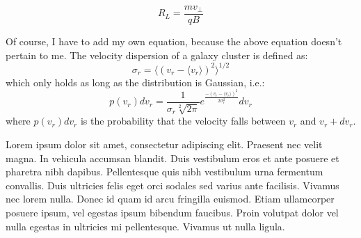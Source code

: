 \begin{equation}
\label{eqn:fakeequation}
R_{L} = \frac{mv_{\perp}}{qB}
\end{equation}

Of course, I have to add my own equation, because the above equation doesn't pertain to me.  The velocity dispersion of a galaxy cluster is defined as:
\begin{equation}
\label{eqn:velocity_dispersion}
\sigma_r = \langle \left(v_r - \langle v_r\rangle \right)^2 \rangle^{1/2}
\end{equation}
which only holds as long as the distribution is Gaussian, i.e.:
\begin{equation}
\label{eqn:gauss}
p\left(v_r\right)dv_r = \frac{1}{\sigma_r \sqrt[2]{2 \pi}} e^{\frac{-\left(v_r - \langle v_r \rangle \right)^2}{2 \sigma_r^2}}d v_r
\end{equation}
where $p\left(v_r \right) d v_r$ is the probability that the velocity falls between $v_r$ and $v_r + dv_r$.


{\noindent}Lorem ipsum dolor sit amet, consectetur adipiscing elit. Praesent nec velit magna. In vehicula accumsan blandit. Duis vestibulum eros et ante posuere et pharetra nibh dapibus. Pellentesque quis nibh vestibulum urna fermentum convallis. Duis ultricies felis eget orci sodales sed varius ante facilisis. Vivamus nec lorem nulla. Donec id quam id arcu fringilla euismod. Etiam ullamcorper posuere ipsum, vel egestas ipsum bibendum faucibus. Proin volutpat dolor vel nulla egestas in ultricies mi pellentesque. Vivamus ut nulla ligula.  

